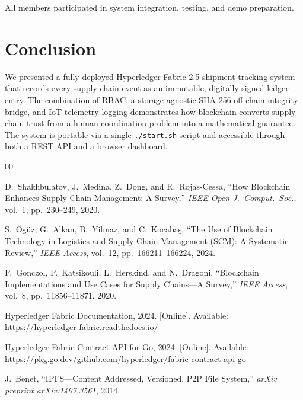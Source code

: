 \documentclass[conference]{IEEEtran}
\begin{document}
All members participated in system integration, testing, and demo preparation.

\section{Conclusion}

We presented a fully deployed Hyperledger Fabric 2.5 shipment tracking
system that records every supply chain event as an immutable, digitally
signed ledger entry.  The combination of RBAC, a storage-agnostic SHA-256
off-chain integrity bridge, and IoT telemetry logging demonstrates how
blockchain converts supply chain trust from a human coordination problem
into a mathematical guarantee.  The system is portable via a single
\texttt{./start.sh} script and accessible through both a REST API and a
browser dashboard.

\begin{thebibliography}{00}

D.~Shakhbulatov, J.~Medina, Z.~Dong, and R.~Rojas-Cessa,
``How Blockchain Enhances Supply Chain Management: A Survey,''
\textit{IEEE Open J.\ Comput.\ Soc.}, vol.~1, pp.~230--249, 2020.

S.~\"{O}g\"{u}z, G.~Alkan, B.~Yilmaz, and C.~Kocaba\c{s},
``The Use of Blockchain Technology in Logistics and Supply Chain
Management (SCM): A Systematic Review,''
\textit{IEEE Access}, vol.~12, pp.~166211--166224, 2024.

P.~Gonczol, P.~Katsikouli, L.~Herskind, and N.~Dragoni,
``Blockchain Implementations and Use Cases for Supply Chains---A Survey,''
\textit{IEEE Access}, vol.~8, pp.~11856--11871, 2020.

Hyperledger Fabric Documentation, 2024.
[Online]. Available: \url{https://hyperledger-fabric.readthedocs.io/}

Hyperledger Fabric Contract API for Go, 2024.
[Online]. Available: \url{https://pkg.go.dev/github.com/hyperledger/fabric-contract-api-go}

J.~Benet,
``IPFS---Content Addressed, Versioned, P2P File System,''
\textit{arXiv preprint arXiv:1407.3561}, 2014.

\end{thebibliography}
\end{document}
